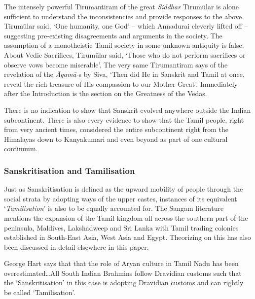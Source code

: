 The intensely powerful Tirumantiram of the great \textit{Siddhar} Tirumūlar is alone sufficient to understand the inconsistencies and provide responses to the above. Tirumūlar said, ‘One humanity, one God’ – which Annadurai cleverly lifted off – suggesting pre-existing disagreements and arguments in the society. The assumption of a monotheistic Tamil society in some unknown antiquity is false. About Vedic Sacrifices, Tirumūlar said, ‘Those who do not perform sacrifices or observe vows become miserable’. The very same Tirumantiram says of the revelation of the \textit{Āgamā-}s by Siva, ‘Then did He in Sanskrit and Tamil at once, reveal the rich treasure of His compassion to our Mother Great’. Immediately after the Introduction is the section on the Greatness of the Vedas.

There is no indication to show that Sanskrit evolved anywhere outside the Indian subcontinent. There is also every evidence to show that the Tamil people, right from very ancient times, considered the entire subcontinent right from the Himalayas down to Kanyakumari and even beyond as part of one cultural continuum.


\subsubsection*{Sanskritisation and Tamilisation}

\vskip -8pt

Just as Sanskritisation is defined as the upward mobility of people through the social strata by adopting ways of the upper castes, instances of its equivalent ‘\textit{Tamilisation}’ is also to be equally accounted for. The Sangam literature mentions the expansion of the Tamil kingdom all across the southern part of the peninsula, Maldives, Lakshadweep and Sri Lanka with Tamil trading colonies established in South-East Asia, West Asia and Egypt. Theorizing on this has also been discussed in detail elsewhere in this paper.

George Hart says that that the role of Aryan culture in Tamil Nadu has been overestimated…All South Indian Brahmins follow Dravidian customs such that the ‘Sanskritisation’ in this case is adopting Dravidian customs and can rightly be called ‘Tamilisation’.



